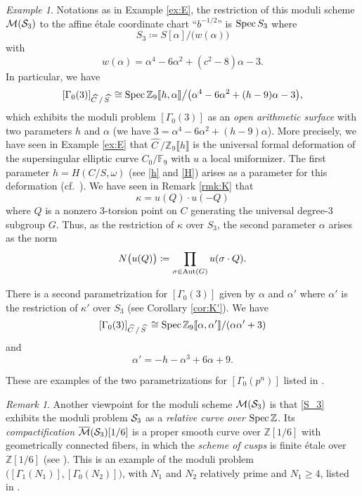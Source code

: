\documentclass{gtpart}
\theoremstyle{definition}
\theoremstyle{remark}
\newtheorem{rmk}[thm]{Remark}
\newtheorem{ex}[thm]{Example}
\newcommand{\mb}[1]{\mathbb{#1}}
\newcommand{\Aut}{{\rm Aut}}
\newcommand{\Spec}{{\rm Spec\thinspace}}
\newcommand{\CM}{{\cal M}}
\newcommand{\CS}{{\cal S}}
\newcommand{\BF}{{\mb F}}
\newcommand{\BZ}{{\mb Z}}
\newcommand{\HC}{\widehat{C~}\!}
\newcommand{\HS}{\widehat{S~}\!}
\newcommand{\A}{\alpha}
\newcommand{\G}{\Gamma}
\newcommand{\K}{\kappa}
\newcommand{\ce}{\coloneqq}
\numberwithin{equation}{section}
\numberwithin{thm}{section}
\begin{document}
\begin{ex}
\label{ex:M(S_3)}
 Notations as in Example \ref{ex:E}, the restriction of this moduli 
 scheme $\CM(\CS_3)$ to the affine \'etale coordinate chart 
 ``$b^{-1/2}$'' is $\Spec S_3$ where 
 \begin{equation}
 \label{S_3}
  S_3 \ce S [\A] \big/ \big( w(\A) \big) 
 \end{equation}
 with 
 \[
  w(\A) = \A^4 - 6 \A^2 + (c^2 - 8) \A - 3.  
 \]
 In particular, we have 
 \[
  [\G_0(3)]_{\HC/\thinspace\HS} 
  \cong \Spec \BZ_9 \llbracket h, \A \rrbracket \big/ 
  \big( \A^4 - 6 \A^2 + (h - 9) \A - 3 \big), 
 \]
 which exhibits the moduli problem $[\G_0(3)]$ as an {\em open 
 arithmetic surface} with two parameters $h$ and $\A$ (we have 
 $3 = \A^4 - 6 \A^2 + (h - 9) \A$).  More precisely, we have seen in 
 Example \ref{ex:E} that $\HC / \BZ_9 \llbracket h \rrbracket$ is the 
 universal formal deformation of the supersingular elliptic curve 
 $C_0/\BF_9$ with $u$ a local uniformizer.  The first parameter 
 $h = H(C/S,\omega)$ (see \eqref{h} and \eqref{H}) arises as a parameter 
 for this deformation (cf.~\cite[12.4.4]{KM}).  We have seen in Remark 
 \ref{rmk:K} that 
 \[
  \K = u(Q) \cdot u(-Q) 
 \]
 where $Q$ is a nonzero 3-torsion point on $C$ generating the universal 
 degree-3 subgroup $G$.  Thus, as the restriction of $\K$ over $S_3$, 
 the second parameter $\A$ arises as the norm 
 \[
  N \big( u(Q) \big) \ce \prod_{\sigma \in \Aut(G)} u(\sigma \cdot Q).  
 \]

 There is a second parametrization for $[\G_0(3)]$ given by $\A$ and 
 $\A'$ where $\A'$ is the restriction of $\K'$ over $S_3$ (see Corollary 
 \ref{cor:K'}).  We have 
 \[
  [\G_0(3)]_{\HC/\thinspace\HS} 
  \cong \Spec \BZ_9 \llbracket \A, \A' \rrbracket / (\A \A' + 3) 
 \]
 and 
 \[
  \A' = -h - \A^3 + 6 \A + 9.  
 \]

 These are examples of the two parametrizations for $[\G_0(p^n)]$ listed 
 in \cite[7.7]{KM}.  
\end{ex}

\begin{rmk}
 Another viewpoint for the moduli scheme $\CM(\CS_3)$ is that 
 \eqref{S_3} exhibits the moduli problem $\CS_3$ as a {\em relative 
 curve over $\Spec \BZ$}.  Its {\em compactification} 
 $\overline{\CM}(\CS_3)[1/6]$ is a proper smooth curve over $\BZ[1/6]$ 
 with geometrically connected fibers, in which the {\em scheme of cusps} 
 is finite \'etale over $\BZ[1/6]$ (see \cite[8.6 and 10.9.5]{KM}).  
 This is an example of the moduli problem 
 $\big( [\G_1(N_1)], [\G_0(N_2)] \big)$, with $N_1$ and $N_2$ relatively 
 prime and $N_1 \geq 4$, listed in \cite[10.9.6]{KM}.  
\end{rmk}
\end{document}
